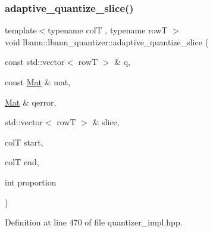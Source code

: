 \subsubsection{\texorpdfstring{adaptive\+\_\+quantize\+\_\+slice()}{adaptive\_quantize\_slice()}}
{\footnotesize\ttfamily template$<$typename colT , typename rowT $>$ \\
void lbann\+::lbann\+\_\+quantizer\+::adaptive\+\_\+quantize\+\_\+slice (\begin{DoxyParamCaption}\item[{const std\+::vector$<$ rowT $>$ \&}]{q,  }\item[{const \hyperlink{base_8hpp_a68f11fdc31b62516cb310831bbe54d73}{Mat} \&}]{mat,  }\item[{\hyperlink{base_8hpp_a68f11fdc31b62516cb310831bbe54d73}{Mat} \&}]{qerror,  }\item[{std\+::vector$<$ rowT $>$ \&}]{slice,  }\item[{colT}]{start,  }\item[{colT}]{end,  }\item[{int}]{proportion }\end{DoxyParamCaption})\hspace{0.3cm}{\ttfamily [private]}}



Definition at line 470 of file quantizer\+\_\+impl.\+hpp.


